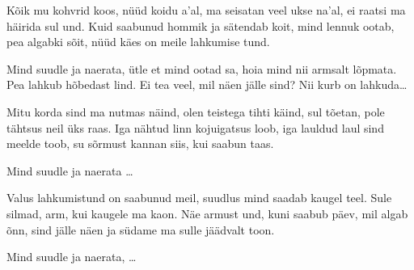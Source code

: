 K\~oik mu kohvrid koos, n\"u\"ud koidu a'al,
ma seisatan veel ukse na'al,
ei raatsi ma h\"airida sul und.
Kuid saabunud hommik ja s\"atendab koit,
mind lennuk ootab, pea algabki s\~oit,
n\"u\"ud k\"aes on meile lahkumise tund.

Mind suudle ja naerata,
\"utle et mind ootad sa,
hoia mind nii armsalt l\~opmata.
Pea lahkub h\~obedast lind.
Ei tea veel, mil n\"aen j\"alle sind?
Nii kurb on lahkuda\ldots

Mitu korda sind ma nutmas n\"aind,
olen teistega tihti k\"aind,
sul t\~oetan, pole t\"ahtsus neil \"uks raas.
Iga n\"ahtud linn kojuigatsus loob,
iga lauldud laul sind meelde toob,
su s\~ormust kannan siis, kui saabun taas.

Mind suudle ja naerata \ldots

Valus lahkumistund on saabunud meil,
suudlus mind saadab kaugel teel.
Sule silmad, arm, kui kaugele ma kaon.
N\"ae armust und, kuni saabub p\"aev,
mil algab \~onn, sind j\"alle n\"aen
ja s\"udame ma sulle j\"a\"advalt toon.

Mind suudle ja naerata, \ldots